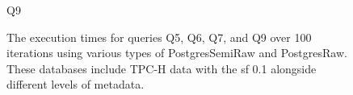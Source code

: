 \begin{figure}[h!]
\begin{minipage}[b]{0.45\linewidth}
    \caption*{Q9}
\end{minipage}
\caption[The execution times for queries Q5, Q6, Q7, and Q9 over 100 iterations]{The execution times for queries Q5, Q6, Q7, and Q9 over 100 iterations using various types of PostgresSemiRaw and PostgresRaw. These databases include TPC-H data with the \acrshort{sf} 0.1 alongside different levels of metadata.}
\label{fig:execution_time_group2}
\end{figure}
